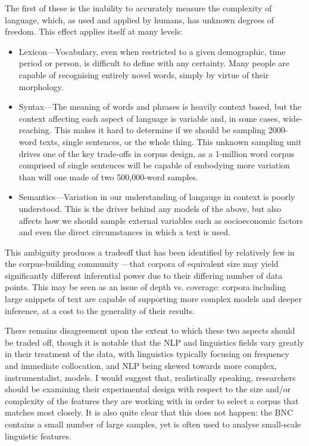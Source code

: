 
The first of these is the inability to accurately measure the complexity of language, which, as used and applied by humans, has unknown degrees of freedom.  This effect applies itself at many levels:

\begin{itemize}
    \item Lexicon---Vocabulary, even when restricted to a given demographic, time period or person, is difficult to define with any certainty.  Many people are capable of recognising entirely novel words, simply by virtue of their morphology. %
    \item Syntax---The meaning of words and phrases is heavily context based, but the context affecting each aspect of language is variable and, in some cases, wide-reaching.  This makes it hard to determine if we should be sampling 2000-word texts, single sentences, or the whole thing.  This unknown sampling unit drives one of the key trade-offs in corpus design, as a 1-million word corpus comprised of single sentences will be capable of embodying more variation than will one made of two 500,000-word samples.
    \item Semantics---Variation in our understanding of langauge in context is poorly understood.  This is the driver behind any models of the above, but also affects how we should sample external variables such as socioeconomic factors and even the direct circumstances in which a text is used.  %
\end{itemize}

This ambiguity produces a tradeoff that has been identified by relatively few in the corpus-building community ---that corpora of equivalent size may yield significantly different inferential power due to their differing number of data points.  This may be seen as an issue of depth vs. coverage: corpora including large snippets of text are capable of supporting more complex models and deeper inference, at a cost to the generality of their results.

There remains disagreement upon the extent to which these two aspects should be traded off, though it is notable that the NLP and linguistics fields vary greatly in their treatment of the data, with linguistics typically focusing on frequency and immediate collocation, and NLP being skewed towards more complex, instrumentalist, models.  I would suggest that, realistically speaking, researchers should be examining their experimental design with respect to the size and/or complexity of the features they are working with in order to select a corpus that matches most closely.  It is also quite clear that this does not happen: the BNC contains a small number of large samples, yet is often used to analyse small-scale linguistic features.

